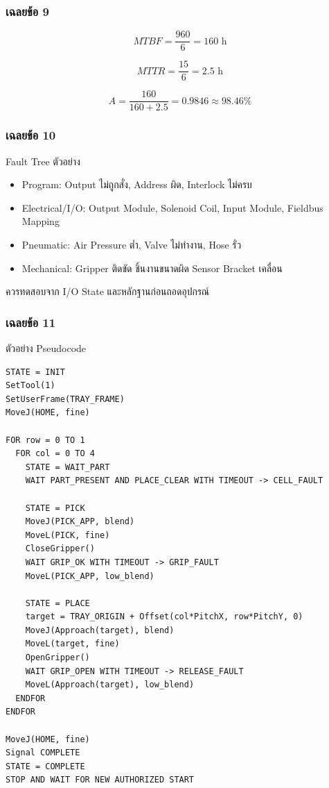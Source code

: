\subsubsection{เฉลยข้อ 9}

\[
MTBF=\frac{960}{6}=160\text{ h}
\]

\[
MTTR=\frac{15}{6}=2.5\text{ h}
\]

\[
A=\frac{160}{160+2.5}=0.9846\approx98.46\%
\]

\subsubsection{เฉลยข้อ 10}

Fault Tree ตัวอย่าง

\begin{itemize}
    \item Program: Output ไม่ถูกสั่ง, Address ผิด, Interlock ไม่ครบ
    \item Electrical/I/O: Output Module, Solenoid Coil, Input Module, Fieldbus Mapping
    \item Pneumatic: Air Pressure ต่ำ, Valve ไม่ทำงาน, Hose รั่ว
    \item Mechanical: Gripper ติดขัด ชิ้นงานขนาดผิด Sensor Bracket เคลื่อน
\end{itemize}

ควรทดสอบจาก I/O State และหลักฐานก่อนถอดอุปกรณ์

\subsubsection{เฉลยข้อ 11}

ตัวอย่าง Pseudocode

\begin{verbatim}
STATE = INIT
SetTool(1)
SetUserFrame(TRAY_FRAME)
MoveJ(HOME, fine)

FOR row = 0 TO 1
  FOR col = 0 TO 4
    STATE = WAIT_PART
    WAIT PART_PRESENT AND PLACE_CLEAR WITH TIMEOUT -> CELL_FAULT

    STATE = PICK
    MoveJ(PICK_APP, blend)
    MoveL(PICK, fine)
    CloseGripper()
    WAIT GRIP_OK WITH TIMEOUT -> GRIP_FAULT
    MoveL(PICK_APP, low_blend)

    STATE = PLACE
    target = TRAY_ORIGIN + Offset(col*PitchX, row*PitchY, 0)
    MoveJ(Approach(target), blend)
    MoveL(target, fine)
    OpenGripper()
    WAIT GRIP_OPEN WITH TIMEOUT -> RELEASE_FAULT
    MoveL(Approach(target), low_blend)
  ENDFOR
ENDFOR

MoveJ(HOME, fine)
Signal COMPLETE
STATE = COMPLETE
STOP AND WAIT FOR NEW AUTHORIZED START
\end{verbatim}

